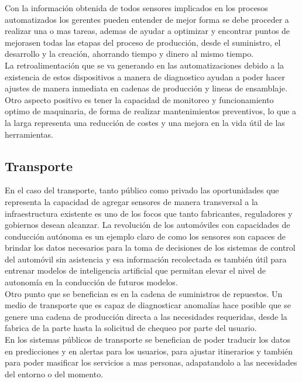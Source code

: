 Con la información obtenida de todos sensores implicados en los procesos automatizados los gerentes pueden entender de mejor forma se debe proceder a realizar una o mas tareas, ademas de ayudar a optimizar y encontrar puntos de mejorasen  todas las etapas del proceso de producción, desde el suministro, el desarrollo y la creación, ahorrando tiempo y dinero al mismo tiempo\cite{ibmiotindustria}.\\

La retroalimentación que se va generando en las automatizaciones debido a la existencia de estos dispositivos a manera de diagnostico ayudan a poder hacer ajustes de manera inmediata en cadenas de producción y lineas de ensamblaje. Otro aspecto positivo es tener la capacidad de monitoreo y funcionamiento optimo de maquinaria, de forma de realizar mantenimientos preventivos, lo que a la larga representa una reducción de costes y una mejora en la vida útil de las herramientas. 

\subsection{Transporte}
En el caso del transporte, tanto público como privado las oportunidades que representa la capacidad de agregar sensores de manera transversal a la infraestructura existente es uno de los focos que tanto fabricantes, reguladores y gobiernos desean alcanzar. La revolución de los automóviles  con capacidades de conducción autónoma es un ejemplo claro de como los sensores son capaces de brindar los datos necesarios para la toma de decisiones de los sistemas de control del automóvil sin asistencia y esa información recolectada es también útil para entrenar modelos de inteligencia artificial que permitan elevar el nivel de autonomía en la conducción de futuros modelos\cite{ibmiottransporte1}.\\

Otro punto que se benefician es en la cadena de suministros de repuestos. Un medio de transporte que es capaz de diagnosticar anomalías hace posible que se genere una cadena de producción directa a las necesidades requeridas, desde la fabrica de la parte hasta la solicitud de chequeo por parte del usuario.\\ 
 
En los sistemas públicos de transporte se benefician de poder traducir los datos en predicciones y en alertas para los usuarios, para ajustar itinerarios y también para poder masificar los servicios a mas personas, adapatandolo a las necesidades del entorno o del momento.\\

